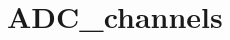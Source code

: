 \hypertarget{group___a_d_c__channels}{\section{A\-D\-C\-\_\-channels}
\label{group___a_d_c__channels}
}

